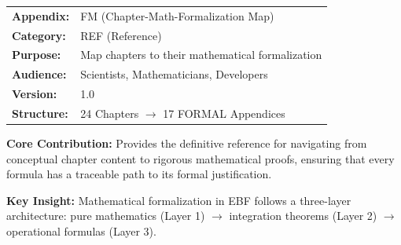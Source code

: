 \begin{tcolorbox}[colback=blue!5!white, colframe=blue!75!black,
    title=\textbf{Appendix UNMAPPED_FM: REF-FORMALMAP}]

\begin{tabular}{@{}ll@{}}
\textbf{Appendix:} & FM (Chapter-Math-Formalization Map) \\
\textbf{Category:} & REF (Reference) \\
\textbf{Purpose:} & Map chapters to their mathematical formalization \\
\textbf{Audience:} & Scientists, Mathematicians, Developers \\
\textbf{Version:} & 1.0 \\
\textbf{Structure:} & 24 Chapters $\rightarrow$ 17 FORMAL Appendices \\
\end{tabular}

\tcblower

\textbf{Core Contribution:} Provides the definitive reference for navigating
from conceptual chapter content to rigorous mathematical proofs, ensuring
that every formula has a traceable path to its formal justification.

\textbf{Key Insight:} Mathematical formalization in EBF follows a three-layer
architecture: pure mathematics (Layer 1) $\rightarrow$ integration theorems
(Layer 2) $\rightarrow$ operational formulas (Layer 3).

\end{tcolorbox}

